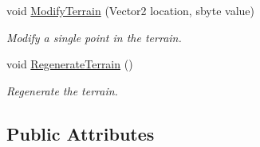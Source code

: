 \begin{DoxyCompactItemize}
void \hyperlink{class_farseer_physics_1_1_common_1_1_texture_tools_1_1_terrain_abc4c9966ac757414f99d4d1d07f0fbf9}{Modify\+Terrain} (Vector2 location, sbyte value)
\begin{DoxyCompactList}\small\item\em Modify a single point in the terrain. \end{DoxyCompactList}\item 
void \hyperlink{class_farseer_physics_1_1_common_1_1_texture_tools_1_1_terrain_a378f0769f037ef19d70459f548d14a07}{Regenerate\+Terrain} ()
\begin{DoxyCompactList}\small\item\em Regenerate the terrain. \end{DoxyCompactList}\end{DoxyCompactItemize}
\subsection*{Public Attributes}
